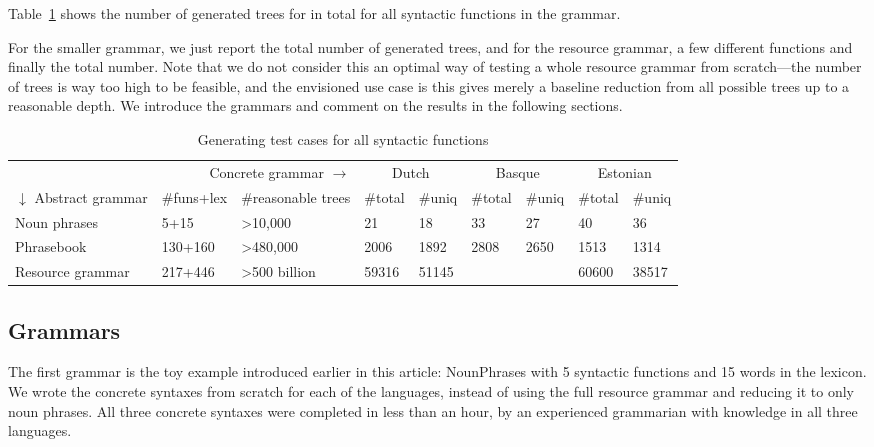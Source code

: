 \documentclass[11pt]{article}
\begin{document}
Table~\ref{results} shows the number of generated trees for 
in total for all syntactic functions in
the grammar. 

For the smaller grammar, we just report the total number of generated
trees, and for the resource grammar, a few different functions and
finally the total number. Note that we do not consider this an optimal way of
testing a whole resource grammar from scratch---the number of trees is
way too high to be feasible, and the envisioned use case is
this gives merely a baseline
reduction from all possible trees up to a reasonable depth.
We introduce the grammars and comment on the results in the following sections.
\begin{table}[]
\centering
\begin{tabular}{|lll|ll|ll|ll|}
\hline
\multicolumn{3}{|r}{Concrete grammar $\rightarrow$}             & \multicolumn{2}{|c}{Dutch} & \multicolumn{2}{|c}{Basque} & \multicolumn{2}{|c|}{Estonian} \\
$\downarrow$ Abstract grammar & \#funs+lex & \#reasonable trees  &
                                                                 \#total     & \#uniq    & \#total     & \#uniq     & \#total      & \#uniq      \\ \hline
Noun phrases     & 5+15          & \textgreater{}10,000          & 21          & 18          & 33          & 27           & 40           & 36            \\
Phrasebook       & 130+160         & \textgreater{}480,000         & 2006        & 1892        & 2808        & 2650         & 1513         & 1314          \\
Resource grammar & 217+446         & \textgreater{}500 billion & 59316       & 51145       &             &              & 60600        & 38517        \\
\hline
\end{tabular}
\caption{Generating test cases for all syntactic functions}
\label{results}
\end{table}
\subsection{Grammars}

The first grammar is the toy example introduced earlier in this
article: NounPhrases with 5 syntactic functions and 15 words in the
lexicon. We wrote the concrete syntaxes from scratch for each of the
languages, instead of using the full resource grammar and reducing it
to only noun phrases. All three concrete syntaxes were completed
in less than an hour, by an experienced grammarian with knowledge in
all three languages.
\end{document}
